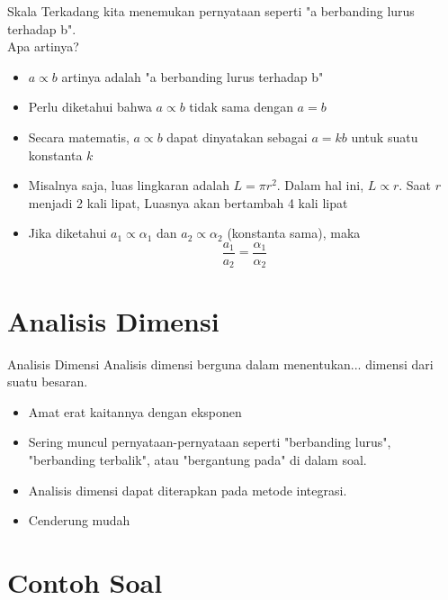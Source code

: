 \documentclass[handout,11pt]{beamer}
\begin{document}
\begin{frame}{Skala}
  Terkadang kita menemukan pernyataan seperti
  "a berbanding lurus terhadap b".\\
  
 Apa artinya?
 \begin{itemize}
   \item $a \propto b$ artinya adalah "a berbanding lurus terhadap b"
   \item Perlu diketahui bahwa $a\propto b$ tidak sama dengan $a=b$
   \item Secara matematis, $a\propto b$ dapat dinyatakan sebagai $a = kb$ untuk suatu konstanta $k$
   \item Misalnya saja, luas lingkaran adalah $L = \pi r^2$. Dalam hal ini, $L \propto r$. Saat $r$ menjadi 2 kali lipat, Luasnya akan bertambah 4 kali lipat
   \item Jika diketahui $a_1 \propto \alpha_1$ dan $a_2 \propto \alpha_2$ (konstanta sama), maka
   $$\frac{a_1}{a_2} = \frac{\alpha_1}{\alpha_2}$$
  
 \end{itemize}
\end{frame}

\section{Analisis Dimensi}
\label{sec:Analisis Dimensi}

\begin{frame}{Analisis Dimensi}
  Analisis dimensi berguna dalam menentukan... dimensi dari suatu besaran.
  \begin{itemize}
    \item Amat erat kaitannya dengan eksponen
    \item Sering muncul pernyataan-pernyataan seperti "berbanding lurus", "berbanding terbalik", atau "bergantung pada" di dalam soal.
    \item Analisis dimensi dapat diterapkan pada metode integrasi.
    \item Cenderung mudah
  \end{itemize}
\end{frame}

\section{Contoh Soal}
\label{sec:Contoh Soal}
\end{document}
